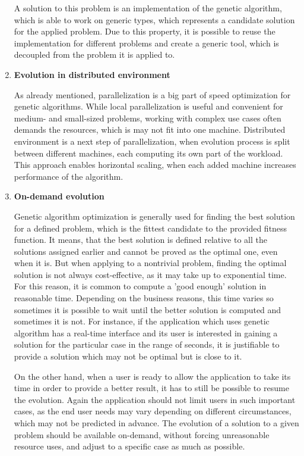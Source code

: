 \begin{enumerate}
A solution to this problem is an implementation of the genetic algorithm, which is able to work on generic types, which represents a candidate solution for the applied problem. Due to this property, it is possible to reuse the implementation for different problems and create a generic tool, which is decoupled from the problem it is applied to.
\medbreak

\item \label{freq:distributed} \textbf{Evolution in distributed environment}

As already mentioned, parallelization is a big part of speed optimization for genetic algorithms. While local parallelization is useful and convenient for medium- and small-sized problems, working with complex use cases often demands the resources, which is may not fit into one machine. Distributed environment is a next step of parallelization, when evolution process is split between different machines, each computing its own part of the workload. This approach enables horizontal scaling, when each added machine increases performance of the algorithm.  
\medbreak

\item \label{freq:on-demand} \textbf{On-demand evolution}

Genetic algorithm optimization is generally used for finding the best solution for a defined problem, which is the fittest candidate to the provided fitness function. It means, that the best solution is defined relative to all the solutions assigned earlier and cannot be proved as the optimal one, even when it is. But when applying to a nontrivial problem, finding the optimal solution is not always cost-effective, as it may take up to exponential time. For this reason, it is common to compute a 'good enough' solution in reasonable time. Depending on the business reasons, this time varies so sometimes it is possible to wait until the better solution is computed and sometimes it is not. For instance, if the application which uses genetic algorithm has a real-time interface and its user is interested in gaining a solution for the particular case in the range of seconds, it is justifiable to provide a solution which may not be optimal but is close to it.

On the other hand, when a user is ready to allow the application to take its time in order to provide a better result, it has to still be possible to resume the evolution. Again the application should not limit users in such important cases, as the end user needs may vary depending on different circumstances, which may not be predicted in advance. The evolution of a solution to a given problem should be available on-demand, without forcing unreasonable resource uses, and adjust to a specific case as much as possible.
\medbreak
\end{enumerate}